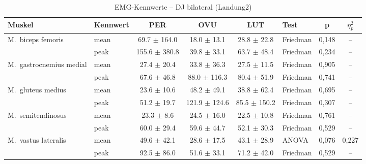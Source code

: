 \begin{table}[H]
  \centering
  \caption{EMG-Kennwerte – DJ bilateral (Landung2)}
  \label{tab:DJ_bilateral_Landung2}
  \small
  \begin{tabular}{l l c c c l c c}
    \hline
    \textbf{Muskel} & \textbf{Kennwert} & \textbf{PER} & \textbf{OVU} & \textbf{LUT} & \textbf{Test} & \textbf{p} & \textbf{$\eta^2_p$} \\
    \hline
    M.~biceps femoris & mean & 69.7 $\pm$ 164.0 & 18.0 $\pm$ 13.1 & 28.8 $\pm$ 22.8 & Friedman & 0{,}148 & -- \\
     & peak & 155.6 $\pm$ 380.8 & 39.8 $\pm$ 33.1 & 63.7 $\pm$ 48.4 & Friedman & 0{,}234 & -- \\
    \hline
    M.~gastrocnemius medial & mean & 27.4 $\pm$ 20.4 & 33.8 $\pm$ 36.3 & 27.5 $\pm$ 11.5 & Friedman & 0{,}905 & -- \\
     & peak & 67.6 $\pm$ 46.8 & 88.0 $\pm$ 116.3 & 80.4 $\pm$ 51.9 & Friedman & 0{,}741 & -- \\
    \hline
    M.~gluteus medius & mean & 23.6 $\pm$ 10.6 & 48.2 $\pm$ 49.1 & 38.8 $\pm$ 62.4 & Friedman & 0{,}695 & -- \\
     & peak & 51.2 $\pm$ 19.7 & 121.9 $\pm$ 124.6 & 85.5 $\pm$ 150.2 & Friedman & 0{,}307 & -- \\
    \hline
    M.~semitendinosus & mean & 23.3 $\pm$ 8.6 & 24.5 $\pm$ 16.0 & 22.5 $\pm$ 10.8 & Friedman & 0{,}761 & -- \\
     & peak & 60.0 $\pm$ 29.4 & 59.6 $\pm$ 44.7 & 52.1 $\pm$ 30.3 & Friedman & 0{,}529 & -- \\
    \hline
    M.~vastus lateralis & mean & 49.6 $\pm$ 42.1 & 28.6 $\pm$ 17.5 & 43.1 $\pm$ 28.9 & ANOVA & 0{,}076 & 0{,}227 \\
     & peak & 92.5 $\pm$ 86.0 & 51.6 $\pm$ 33.1 & 71.2 $\pm$ 42.0 & Friedman & 0{,}529 & -- \\
    \hline
  \end{tabular}
\end{table}

